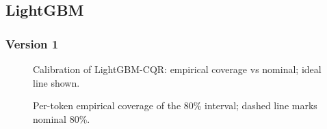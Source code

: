 \documentclass[
  a4paper,
  DIV=11,
  numbers=noendperiod]{scrreprt}
\begin{document}
\subsection{LightGBM}\label{lightgbm}

\subsubsection{Version 1}\label{version-1-1}

\begin{figure}


\caption{\label{fig-lgbm-cqr-calibration}Calibration of LightGBM-CQR:
empirical coverage vs nominal; ideal line shown.}

\end{figure}%

\begin{figure}


\caption{\label{fig-lgbm-cqr-coverage-80pi-per-token}Per-token empirical
coverage of the 80\% interval; dashed line marks nominal 80\%.}

\end{figure}%
\end{document}
